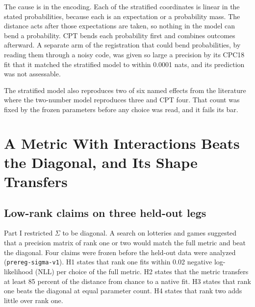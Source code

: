 \documentclass[journal]{IEEEtran}
\begin{document}
The cause is in the encoding.
Each of the stratified coordinates is linear in the stated probabilities, because each is an expectation or a probability mass.
The distance acts after those expectations are taken, so nothing in the model can bend a probability.
CPT bends each probability first and combines outcomes afterward.
A separate arm of the registration that could bend probabilities, by reading them through a noisy code, was given so large a precision by its CPC18 fit that it matched the stratified model to within 0.0001 nats, and its prediction was not assessable.

The stratified model also reproduces two of six named effects from the literature where the two-number model reproduces three and CPT four.
That count was fixed by the frozen parameters before any choice was read, and it fails its bar.

\section{A Metric With Interactions Beats the Diagonal, and Its Shape Transfers}
\label{sec:lowrank}

\subsection{Low-rank claims on three held-out legs}
Part I restricted $\Sigma$ to be diagonal.
A search on lotteries and games suggested that a precision matrix of rank one or two would match the full metric and beat the diagonal.
Four claims were frozen before the held-out data were analyzed (\texttt{prereg-sigma-v1}).
H1 states that rank one fits within 0.02 negative log-likelihood (NLL) per choice of the full metric.
H2 states that the metric transfers at least 85 percent of the distance from chance to a native fit.
H3 states that rank one beats the diagonal at equal parameter count.
H4 states that rank two adds little over rank one.
\end{document}
